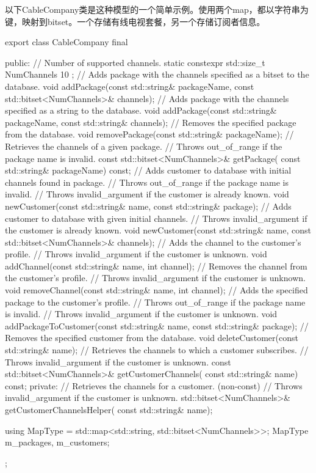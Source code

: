 以下CableCompany类是这种模型的一个简单示例。使用两个map，都以字符串为键，映射到bitset。一个存储有线电视套餐，另一个存储订阅者信息。

\begin{cpp}
export class CableCompany final
{
    public:
    // Number of supported channels.
    static constexpr std::size_t NumChannels { 10 };
    // Adds package with the channels specified as a bitset to the database.
    void addPackage(const std::string& packageName,
        const std::bitset<NumChannels>& channels);
    // Adds package with the channels specified as a string to the database.
    void addPackage(const std::string& packageName,
        const std::string& channels);
    // Removes the specified package from the database.
    void removePackage(const std::string& packageName);
    // Retrieves the channels of a given package.
    // Throws out_of_range if the package name is invalid.
    const std::bitset<NumChannels>& getPackage(
        const std::string& packageName) const;
    // Adds customer to database with initial channels found in package.
    // Throws out_of_range if the package name is invalid.
    // Throws invalid_argument if the customer is already known.
    void newCustomer(const std::string& name, const std::string& package);
    // Adds customer to database with given initial channels.
    // Throws invalid_argument if the customer is already known.
    void newCustomer(const std::string& name,
        const std::bitset<NumChannels>& channels);
    // Adds the channel to the customer's profile.
    // Throws invalid_argument if the customer is unknown.
    void addChannel(const std::string& name, int channel);
    // Removes the channel from the customer's profile.
    // Throws invalid_argument if the customer is unknown.
    void removeChannel(const std::string& name, int channel);
    // Adds the specified package to the customer's profile.
    // Throws out_of_range if the package name is invalid.
    // Throws invalid_argument if the customer is unknown.
    void addPackageToCustomer(const std::string& name,
    const std::string& package);
    // Removes the specified customer from the database.
    void deleteCustomer(const std::string& name);
    // Retrieves the channels to which a customer subscribes.
    // Throws invalid_argument if the customer is unknown.
    const std::bitset<NumChannels>& getCustomerChannels(
        const std::string& name) const;
    private:
        // Retrieves the channels for a customer. (non-const)
        // Throws invalid_argument if the customer is unknown.
        std::bitset<NumChannels>& getCustomerChannelsHelper(
            const std::string& name);

        using MapType = std::map<std::string, std::bitset<NumChannels>>;
        MapType m_packages, m_customers;
};
\end{cpp}

